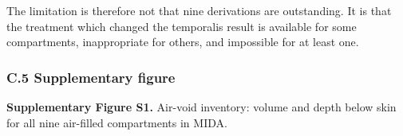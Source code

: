 \documentclass[manuscript,review,anonymous]{acmart}
\begin{document}
The limitation is therefore not that nine derivations are outstanding. It is that
the treatment which changed the temporalis result is available for some
compartments, inappropriate for others, and impossible for at least one.

\subsubsection{C.5 Supplementary figure}\label{c.5-supplementary-figure}

\textbf{Supplementary Figure S1.} Air-void inventory: volume and depth below skin for
all nine air-filled compartments in MIDA.
\end{document}
